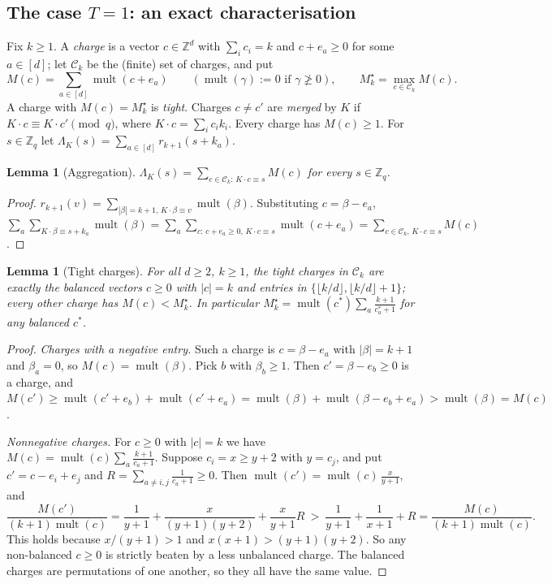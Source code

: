 \documentclass[11pt]{article}
\newcommand{\Z}{\mathbb{Z}}
\newcommand{\mult}{\operatorname{mult}}
\newtheorem{lemma}[theorem]{Lemma}
\theoremstyle{definition}
\theoremstyle{remark}
\begin{document}
\subsection{The case $T=1$: an exact characterisation}\label{sec:t1iff}
Fix $k\ge1$. A \emph{charge} is a vector $c\in\Z^d$ with $\sum_ic_i=k$ and $c+e_a\ge0$ for some $a\in[d]$; let $\mathcal C_k$ be the
(finite) set of charges, and put
\[
M(c)=\sum_{a\in[d]}\mult(c+e_a)\qquad(\mult(\gamma):=0\text{ if }\gamma\not\ge0),\qquad M^\star_k=\max_{c\in\mathcal C_k}M(c).
\]
A charge with $M(c)=M^\star_k$ is \emph{tight}. Charges $c\ne c'$ are \emph{merged} by $K$ if $K\cdot c\equiv K\cdot c'\pmod q$, where
$K\cdot c=\sum_ic_ik_i$. Every charge has $M(c)\ge1$. For $s\in\Z_q$ let $\Lambda_K(s)=\sum_{a\in[d]}r_{k+1}(s+k_a)$.

\begin{lemma}[Aggregation]\label{lem:agg}
$\Lambda_K(s)=\sum_{c\in\mathcal C_k:\,K\cdot c\equiv s}M(c)$ for every $s\in\Z_q$.
\end{lemma}
\begin{proof}
$r_{k+1}(v)=\sum_{|\beta|=k+1,\,K\cdot\beta\equiv v}\mult(\beta)$. Substituting $c=\beta-e_a$,
$\sum_a\sum_{K\cdot\beta\equiv s+k_a}\mult(\beta)=\sum_a\sum_{c:\,c+e_a\ge0,\,K\cdot c\equiv s}\mult(c+e_a)=\sum_{c\in\mathcal C_k,\,K\cdot c\equiv s}M(c)$.
\end{proof}

\begin{lemma}[Tight charges]\label{lem:t1tight}
For all $d\ge2$, $k\ge1$, the tight charges in $\mathcal C_k$ are exactly the balanced vectors $c\ge0$ with $|c|=k$ and entries in
$\{\lfloor k/d\rfloor,\lfloor k/d\rfloor+1\}$; every other charge has $M(c)<M^\star_k$. In particular
$M^\star_k=\mult(c^\ast)\sum_a\frac{k+1}{c^\ast_a+1}$ for any balanced $c^\ast$.
\end{lemma}
\begin{proof}
\emph{Charges with a negative entry.} Such a charge is $c=\beta-e_a$ with $|\beta|=k+1$ and $\beta_a=0$, so $M(c)=\mult(\beta)$.
Pick $b$ with $\beta_b\ge1$. Then $c'=\beta-e_b\ge0$ is a charge, and
$M(c')\ge\mult(c'+e_b)+\mult(c'+e_a)=\mult(\beta)+\mult(\beta-e_b+e_a)>\mult(\beta)=M(c)$.

\emph{Nonnegative charges.} For $c\ge0$ with $|c|=k$ we have $M(c)=\mult(c)\sum_a\frac{k+1}{c_a+1}$. Suppose $c_i=x\ge y+2$ with
$y=c_j$, and put $c'=c-e_i+e_j$ and $R=\sum_{a\ne i,j}\frac1{c_a+1}\ge0$. Then $\mult(c')=\mult(c)\,\frac{x}{y+1}$, and
\[
\frac{M(c')}{(k+1)\mult(c)}=\frac1{y+1}+\frac{x}{(y+1)(y+2)}+\frac{x}{y+1}R\ >\ \frac1{y+1}+\frac1{x+1}+R=\frac{M(c)}{(k+1)\mult(c)} .
\]
This holds because $x/(y+1)>1$ and $x(x+1)>(y+1)(y+2)$. So any non-balanced $c\ge0$ is strictly beaten by a less unbalanced charge.
The balanced charges are permutations of one another, so they all have the same value.
\end{proof}
\end{document}
